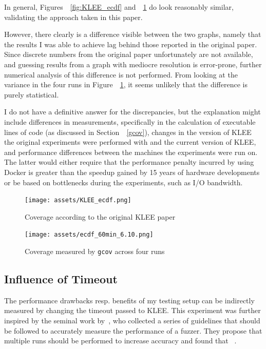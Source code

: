 \documentclass{article}
\let\savedCite=\cite
\renewcommand{\cite}{\unskip~\savedCite}
\let\savedRef=\ref
\renewcommand{\ref}{\unskip~\savedRef}
\begin{document}
In general, Figures~\ref{fig:KLEE_ecdf} and~\ref{fig:ecdf_60min_6.10} do look reasonably similar, validating the approach taken in this paper.

However, there clearly is a difference visible between the two graphs, namely that the results I was able to achieve lag behind those reported in the original paper. Since discrete numbers from the original paper unfortunately are not available, and guessing results from a graph with mediocre resolution is error-prone, further numerical analysis of this difference is not performed. From looking at the variance in the four runs in Figure~\ref{fig:ecdf_60min_6.10}, it seems unlikely that the difference is purely statistical.

I do not have a definitive answer for the discrepancies, but the explanation might include differences in measurements, specifically in the calculation of executable lines of code (as discussed in Section~\ref{gcov}), changes in the version of KLEE the original experiments were performed with and the current version of KLEE, and performance differences between the machines the experiments were run on. The latter would either require that the performance penalty incurred by using Docker is greater than the speedup gained by 15 years of hardware developments or be based on bottlenecks during the experiments, such as I/O bandwidth.

\begin{figure}[ht]
    \centering
    \begin{minipage}[b]{0.48\linewidth}
        \texttt{[image: assets/KLEE\_ecdf.png]}
        \captionsetup{width=0.7\linewidth, skip=24px}
        \caption{Coverage according to the original KLEE paper\cite{KLEE}}
        \label{fig:KLEE_ecdf}
    \end{minipage}
    \hfill
    \begin{minipage}[b]{0.48\linewidth}
        \texttt{[image: assets/ecdf\_60min\_6.10.png]}
        \captionsetup{width=0.75\linewidth}
        \caption{Coverage measured by \lstinline{gcov} across four runs}
        \label{fig:ecdf_60min_6.10}
    \end{minipage}
\end{figure}

\subsection{Influence of Timeout}

The performance drawbacks resp. benefits of my testing setup can be indirectly measured by changing the timeout passed to KLEE. This experiment was further inspired by the seminal work by~\citeauthor{EvaluatingFuzzTesting}, who collected a series of guidelines that should be followed to accurately measure the performance of a fuzzer. They propose that multiple runs should be performed to increase accuracy and found that \cite{EvaluatingFuzzTesting}.
\end{document}
